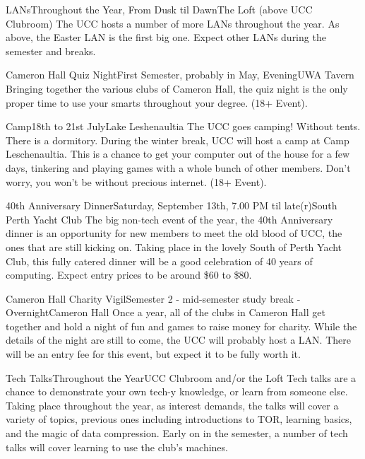 \begin{event}{LANs}{Throughout the Year, From Dusk til Dawn}{The Loft (above UCC Clubroom)}
The UCC hosts a number of more LANs throughout the year. As above, the Easter LAN is the first big one. Expect other LANs during the semester and breaks.
\end{event}

\begin{event}{Cameron Hall Quiz Night}{First Semester, probably in May, Evening}{UWA Tavern}
Bringing together the various clubs of Cameron Hall, the quiz night is the only proper time to use your smarts throughout your degree.  (18+ Event).
\end{event}

\begin{event}{Camp}{18th to 21st July}{Lake Leshenaultia}
The UCC goes camping! Without tents. There is a dormitory. During the winter break, UCC will host a camp at Camp Leschenaultia. This is a chance to get your computer out of the house for a few days, tinkering and playing games with a whole bunch of other members. Don't worry, you won't be without precious internet. (18+ Event).
\end{event}

\begin{event}{40th Anniversary Dinner}{Saturday, September 13th, 7.00 PM til late(r)}{South Perth Yacht Club}
The big non-tech event of the year, the 40th Anniversary dinner is an opportunity for new members to meet the old blood of UCC, the ones that are still kicking on. Taking place in the lovely South of Perth Yacht Club, this fully catered dinner will be a good celebration of 40 years of computing. Expect entry prices to be around \$60 to \$80.
\end{event}

\begin{event}{Cameron Hall Charity Vigil}{Semester 2 - mid-semester study break - Overnight}{Cameron Hall}
Once a year, all of the clubs in Cameron Hall get together and hold a night of fun and games to raise money for charity. While the details of the night are still to come, the UCC will probably host a LAN. There will be an entry fee for this event, but expect it to be fully worth it.
\end{event}

\begin{event}{Tech Talks}{Throughout the Year}{UCC Clubroom and/or the Loft}
Tech talks are a chance to demonstrate your own tech-y knowledge, or learn from someone else. Taking place throughout the year, as interest demands, the talks will cover a variety of topics, previous ones including introductions to TOR, learning basics, and the magic of data compression. Early on in the semester, a number of tech talks will cover learning to use the club's machines.
\end{event}



